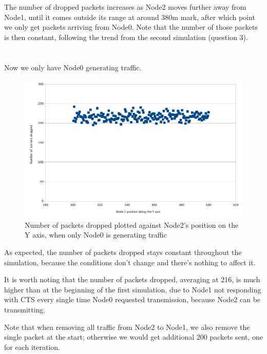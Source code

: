 \documentclass[11pt,journal]{article}
\begin{document}
	The number of dropped packets increases as Node2 moves further away from Node1, until it comes outside its range at around 380m mark, after which point we only get packets arriving from Node0. Note that the number of those packets is then constant, following the trend from the second simulation (question 3).
	
	\section{}
	Now we only have Node0 generating traffic.
		
	\begin{figure}[h]
		\centering
		\includegraphics[scale=0.6]{graph2.png}
		\caption{Number of packets dropped plotted against Node2's position on the Y axis, when only Node0 is generating traffic}
	\end{figure}

	As expected, the number of packets dropped stays constant throughout the simulation, because the conditions don't change and there's nothing to affect it.
	
	It is worth noting that the number of packets dropped, averaging at 216, is much higher than at the beginning of the first simulation, due to Node1 not responding with CTS every single time Node0 requested transmission, because Node2 can be transmitting.

	Note that when removing all traffic from Node2 to Node1, we also remove the single packet at the start; otherwise we would get additional 200 packets sent, one for each iteration.
\end{document}
